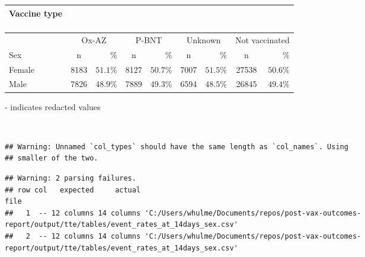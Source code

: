 \documentclass[
]{article}
\begin{document}
\captionsetup[table]{labelformat=empty,skip=1pt}
\begin{longtable}{lcrcrcrcr}
\caption*{
\large Vaccine type\\ 
\small \\ 
} \\ 
\toprule
& \multicolumn{2}{c}{Ox-AZ} & \multicolumn{2}{c}{P-BNT} & \multicolumn{2}{c}{Unknown} & \multicolumn{2}{c}{Not vaccinated} \\ 
 \cmidrule(lr){2-3}\cmidrule(lr){4-5}\cmidrule(lr){6-7}\cmidrule(lr){8-9}
Sex & n & \% & n & \% & n & \% & n & \% \\ 
\midrule
Female & 8183 & $51.1\%$ & 8127 & $50.7\%$ & 7007 & $51.5\%$ & 27538 & $50.6\%$ \\ 
Male & 7826 & $48.9\%$ & 7889 & $49.3\%$ & 6594 & $48.5\%$ & 26845 & $49.4\%$ \\ 
\bottomrule
\end{longtable}
\begin{minipage}{\linewidth}
- indicates redacted values\\ 
\end{minipage}

~ ~

\begin{verbatim}
## Warning: Unnamed `col_types` should have the same length as `col_names`. Using
## smaller of the two.
\end{verbatim}

\begin{verbatim}
## Warning: 2 parsing failures.
## row col   expected     actual                                                                                                       file
##   1  -- 12 columns 14 columns 'C:/Users/whulme/Documents/repos/post-vax-outcomes-report/output/tte/tables/event_rates_at_14days_sex.csv'
##   2  -- 12 columns 14 columns 'C:/Users/whulme/Documents/repos/post-vax-outcomes-report/output/tte/tables/event_rates_at_14days_sex.csv'
\end{verbatim}
\end{document}
